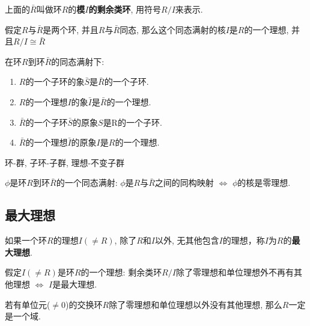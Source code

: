 \begin{Definition}[模$I$的剩余类环]
上面的$\bar{R}$叫做环$R$的\textbf{模$I$的剩余类环}, 用符号$R/I$来表示.
\end{Definition}

\begin{Theorem}[!]
假定$R$与$\bar{R}$是两个环, 并且$R$与$\bar{R}$同态, 那么这个同态满射的核$I$是$R$的一个理想, 并且$R/I \cong \bar{R}$
\end{Theorem}

\begin{Theorem}
在环$R$到环$\bar{R}$的同态满射下:
\begin{enumerate}[(1)]
	\item $R$的一个子环的象$\bar{S}$是$\bar{R}$的一个子环.
	\item $R$的一个理想$I$的象$\bar{I}$是$\bar{R}$的一个理想.
	\item $\bar{R}$的一个子环$\bar{S}$的原象$S$是R的一个子环.
	\item $\bar{R}$的一个理想$\bar{I}$的原象$I$是$R$的一个理想.
\end{enumerate}

\end{Theorem}

\begin{Note}
	环-群, 子环-子群, 理想-不变子群
\end{Note}

\begin{Proposition}
$\phi$是环$R$到环$\bar{R}$的一个同态满射: $\phi$是$R$与$\bar{R}$之间的同构映射 $\Leftrightarrow$ $\phi$的核是零理想.
\end{Proposition}

\subsection{最大理想}

\begin{Definition}[最大理想]
如果一个环$R$的理想$I (\neq R)$, 除了$R$和$I$以外, 无其他包含$I$的理想，称$I$为$R$的\textbf{最大理想}.
\end{Definition}

\begin{Lemma}
假定$I (\neq R)$是环$R$的一个理想: 剩余类环$R/I$除了零理想和单位理想外不再有其他理想 $\Leftrightarrow$ $I$是最大理想.
\end{Lemma}

\begin{Lemma}
若有单位元($\neq \mathfrak{0}$)的交换环$R$除了零理想和单位理想以外没有其他理想, 那么$R$一定是一个域.
\end{Lemma}

